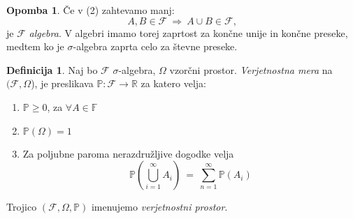 \documentclass[11pt]{article}
\theoremstyle{definition}
\newtheorem{definicija}{Definicija}[section]
\theoremstyle{definition}
\theoremstyle{definition}
\newtheorem*{opomba}{Opomba}
\begin{document}
\begin{opomba}

Če v (2) zahtevamo manj:
$$A, B \in \mathcal{F} ~\Rightarrow~ A \cup B \in \mathcal{F},$$
je $\mathcal{F}$ \textit{algebra}. V algebri imamo torej zaprtost za končne unije in končne preseke, medtem ko je $\sigma$-algebra zaprta celo za števne preseke.

\end{opomba}
\vspace{0.5cm}

\begin{definicija}
Naj bo $\mathcal{F}$ $\sigma$-algebra, $\Omega$ vzorčni prostor. \textit{Verjetnostna mera} na $(\mathcal{F}, \Omega$), je preslikava $\mathbb{P}: \mathcal{F} \rightarrow \mathbb{R}$ za katero velja:
\begin{enumerate}
	\item $\mathbb{P} \geq 0$, za $\forall A \in \mathbb{F}$
	\item $\mathbb{P}(\Omega) = 1$
	\item Za poljubne paroma nerazdružljive dogodke velja
	$$\mathbb{P}\left( \bigcup_{i=1}^{\infty} A_i \right) ~=~ \sum_{n=1}^{\infty} \mathbb{P}(A_i)$$
\end{enumerate}
Trojico $(\mathcal{F}, \Omega, \mathbb{P})$ imenujemo \textit{verjetnostni prostor}.
\end{definicija}
\vspace{0.5cm}
\end{document}

